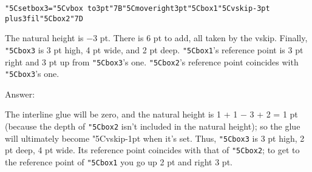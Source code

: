 \def\\{\char"5C}
\def\{{\char"7B}
\def\}{\char"7D}
\def\1{{\tt \\box1}}
\def\2{{\tt \\box2}}
\def\3{{\tt \\box3}}
{\tt \\setbox3=\\vbox to3pt\{\\moveright3pt\\box1\\vskip-3pt plus3fil\\box2\}}

The natural height is $-3$ pt. 
There is 6 pt to add, all taken by the vskip.
Finally, \3 is 3 pt high, 4 pt wide, and 2 pt deep.
\1's reference point is 3 pt right and 3 pt up from \3's one.
\2's reference point coincides with \3's one.

Answer:

The interline glue will be zero, and the natural height is 1 + 1 − 3 + 2 = 1 pt
(because the depth of \2 isn’t included in the natural height); so the glue will
ultimately become \\vskip-1pt when it’s set. Thus, \3 is 3 pt high, 2 pt deep, 4 pt
wide. Its reference point coincides with that of \2; to get to the reference point of
\1 you go up 2 pt and right 3 pt.


\bye
